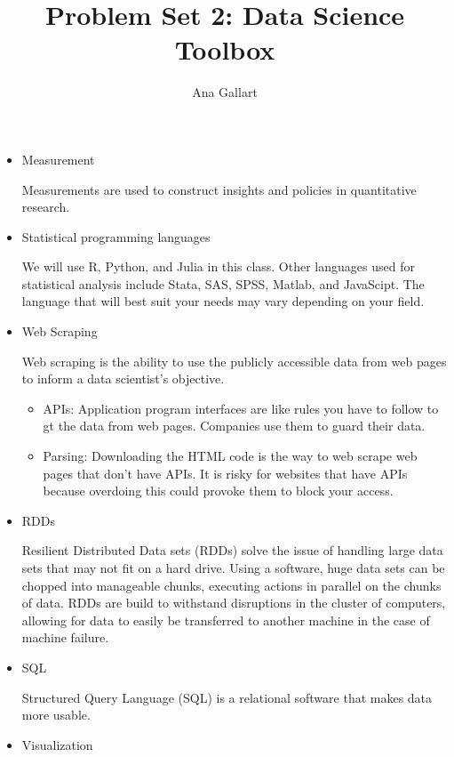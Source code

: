 \documentclass{article}
\title{Problem Set 2: Data Science Toolbox}
\author{Ana Gallart}
\begin{document}
\maketitle


\begin{itemize}

\item{Measurement}

Measurements are used to construct insights and policies in quantitative research.


\item{Statistical programming languages}

We will use R, Python, and Julia in this class. Other languages used for statistical analysis include Stata, SAS, SPSS, Matlab, and JavaScipt. The language that will best suit your needs may vary depending on your field.


\item{Web Scraping}

Web scraping is the ability to use the publicly accessible data from web pages to inform a data scientist's objective. 
\begin{itemize}
\item{APIs: Application program interfaces are like rules you have to follow to gt the data from web pages. Companies use them to guard their data.} 

\item{Parsing: Downloading the HTML code is the way to web scrape web pages that don't have APIs. It is risky for websites that have APIs because overdoing this could provoke them to block your access.}
    
\end{itemize}


\item{RDDs}

Resilient Distributed Data sets (RDDs) solve the issue of handling large data sets that may not fit on a hard drive. Using a software, huge data sets can be chopped into manageable chunks, executing actions in parallel on the chunks of data. RDDs are build to withstand disruptions in the cluster of computers, allowing for data to easily be transferred to another machine in the case of machine failure.

\item {SQL}

Structured Query Language (SQL) is a relational software that makes data more usable. 

\item{Visualization}


\end{itemize}
\end{document}
